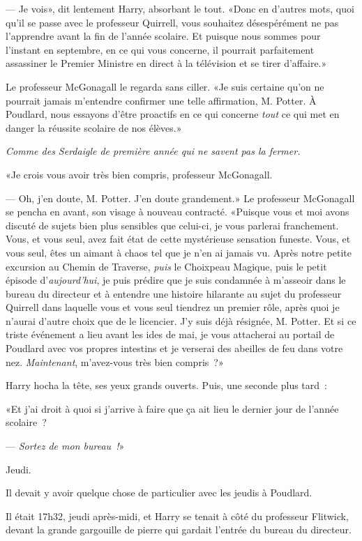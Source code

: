 --- Je vois», dit lentement Harry, absorbant le tout. «Donc en d'autres mots, quoi qu'il se passe avec le professeur Quirrell, vous souhaitez désespérément ne pas l'apprendre avant la fin de l'année scolaire. Et puisque nous sommes pour l'instant en septembre, en ce qui vous concerne, il pourrait parfaitement assassiner le Premier Ministre en direct à la télévision et se tirer d'affaire.»

Le professeur McGonagall le regarda sans ciller. «Je suis certaine qu'on ne pourrait jamais m'entendre confirmer une telle affirmation, M. Potter. À Poudlard, nous essayons d'être proactifs en ce qui concerne \emph{tout} ce qui met en danger la réussite scolaire de nos élèves.»

\emph{Comme des Serdaigle de première année qui ne savent pas la fermer.}

«Je crois vous avoir très bien compris, professeur McGonagall.

--- Oh, j'en doute, M. Potter. J'en doute grandement.» Le professeur McGonagall se pencha en avant, son visage à nouveau contracté. «Puisque vous et moi avons discuté de sujets bien plus sensibles que celui-ci, je vous parlerai franchement. Vous, et vous seul, avez fait état de cette mystérieuse sensation funeste. Vous, et vous seul, êtes un aimant à chaos tel que je n'en ai jamais vu. Après notre petite excursion au Chemin de Traverse, \emph{puis} le Choixpeau Magique, puis le petit épisode d'\emph{aujourd'hui}, je puis prédire que je suis condamnée à m'asseoir dans le bureau du directeur et à entendre une histoire hilarante au sujet du professeur Quirrell dans laquelle vous et vous seul tiendrez un premier rôle, après quoi je n'aurai d'autre choix que de le licencier. J'y suis déjà résignée, M. Potter. Et si ce triste événement a lieu avant les ides de mai, je vous attacherai au portail de Poudlard avec vos propres intestins et je verserai des abeilles de feu dans votre nez. \emph{Maintenant}, m'avez-vous très bien compris~?»

Harry hocha la tête, ses yeux grands ouverts. Puis, une seconde plus tard~:

«Et j'ai droit à quoi si j'arrive à faire que ça ait lieu le dernier jour de l'année scolaire~?

--- \emph{Sortez de mon bureau~!}»

\later

Jeudi.

Il devait y avoir quelque chose de particulier avec les jeudis à Poudlard.

Il était 17h32, jeudi après-midi, et Harry se tenait à côté du professeur Flitwick, devant la grande gargouille de pierre qui gardait l'entrée du bureau du directeur.

